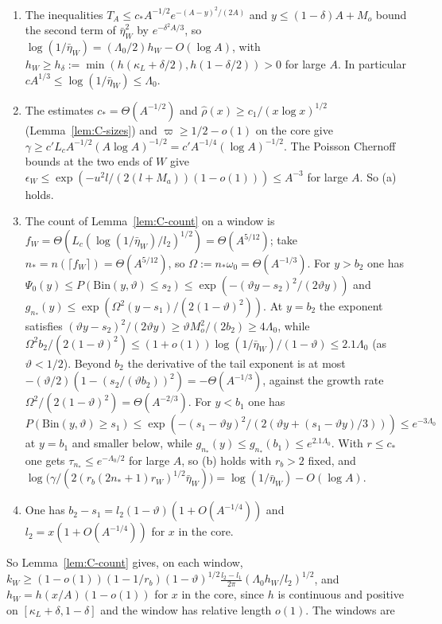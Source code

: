 \begin{enumerate}
\item The inequalities $T_A\le c_*A^{-1/2}e^{-(A-y)^2/(2A)}$ and $y\le(1-\delta)A+M_o$ bound the second term of $\bar\eta_W^2$ by $e^{-\delta^2A/3}$,
so $\log(1/\bar\eta_W)=(\Lambda_0/2)h_W-O(\log A)$, with $h_W\ge h_\delta:=\min(h(\kappa_L+\delta/2),h(1-\delta/2))>0$ for large $A$. In
particular $cA^{1/3}\le\log(1/\bar\eta_W)\le\Lambda_0$.
\item The estimates $c_*=\Theta(A^{-1/2})$ and $\hat\rho(x)\ge c_1/(x\log x)^{1/2}$ (Lemma~\ref{lem:C-sizes}) and $\varpi\ge1/2-o(1)$ on the core give
$\gamma\ge c'L_cA^{-1/2}(A\log A)^{-1/2}=c'A^{-1/4}(\log A)^{-1/2}$. The Poisson Chernoff bounds at the two ends of $W$ give
$\epsilon_W\le\exp(-u^2l/(2(l+M_a))(1-o(1)))\le A^{-3}$ for large $A$. So (a) holds.
\item The count of Lemma~\ref{lem:C-count} on a window is $f_W=\Theta(L_c(\log(1/\bar\eta_W)/l_2)^{1/2})=\Theta(A^{5/12})$; take
$n_*=n(\lceil f_W\rceil)=\Theta(A^{5/12})$, so $\Omega:=n_*\omega_0=\Theta(A^{-1/3})$. For $y>b_2$ one has $\Psi_0(y)\le P(\mathrm{Bin}(y,\vartheta)\le s_2)\le\exp(-(\vartheta y-s_2)^2/(2\vartheta y))$ and
$g_{n_*}(y)\le\exp(\Omega^2(y-s_1)/(2(1-\vartheta)^2))$. At $y=b_2$ the exponent satisfies $(\vartheta y-s_2)^2/(2\vartheta y)\ge\vartheta M_o^2/(2b_2)\ge4\Lambda_0$,
while $\Omega^2b_2/(2(1-\vartheta)^2)\le(1+o(1))\log(1/\bar\eta_W)/(1-\vartheta)\le2.1\Lambda_0$ (as $\vartheta<1/2$). Beyond $b_2$ the
derivative of the tail exponent is at most $-(\vartheta/2)(1-(s_2/(\vartheta b_2))^2)=-\Theta(A^{-1/3})$, against the growth rate
$\Omega^2/(2(1-\vartheta)^2)=\Theta(A^{-2/3})$. For $y<b_1$ one has $P(\mathrm{Bin}(y,\vartheta)\ge s_1)\le\exp(-(s_1-\vartheta y)^2/(2(\vartheta y+(s_1-\vartheta y)/3)))\le e^{-3\Lambda_0}$ at $y=b_1$ and
smaller below, while $g_{n_*}(y)\le g_{n_*}(b_1)\le e^{2.1\Lambda_0}$. With $r\le c_*$ one gets $\tau_{n_*}\le e^{-\Lambda_0/2}$ for large $A$, so (b)
holds with $r_b>2$ fixed, and $\log\bigl(\gamma/(2(r_b(2n_*+1)r_W)^{1/2}\bar\eta_W)\bigr)=\log(1/\bar\eta_W)-O(\log A)$.
\item One has $b_2-s_1=l_2(1-\vartheta)(1+O(A^{-1/4}))$ and $l_2=x(1+O(A^{-1/4}))$ for $x$ in the core.
\end{enumerate}
So Lemma~\ref{lem:C-count} gives, on each window,
$k_W\ge(1-o(1))(1-1/r_b)(1-\vartheta)^{1/2}\frac{l_2-l_1}{2\pi}(\Lambda_0h_W/l_2)^{1/2}$, and $h_W=h(x/A)(1-o(1))$ for $x$ in the
core, since $h$ is continuous and positive on $[\kappa_L+\delta,1-\delta]$ and the window has relative length $o(1)$. The windows are
